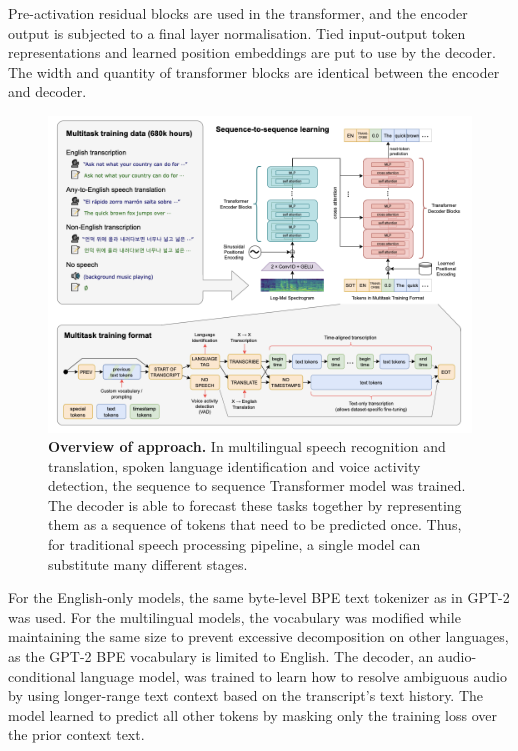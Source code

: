\documentclass[conference]{IEEEtran}
\begin{document}
Pre-activation residual blocks are used in the transformer, and the encoder output is subjected to a final layer normalisation. Tied input-output token representations and learned position embeddings are put to use by the decoder. The width and quantity of transformer blocks are identical between the encoder and decoder.

\begin{figure}[ht]
\centering
\includegraphics[width=\textwidth]{1.png}
\caption{\textbf{Overview of approach.} In multilingual speech recognition and translation, spoken language identification and voice activity detection, the sequence to sequence Transformer model was trained. The decoder is able to forecast these tasks together by representing them as a sequence of tokens that need to be predicted once.
Thus, for traditional speech processing pipeline, a single model can substitute many different stages.}
\label{fig:whisper_asr_architecture}
\end{figure}

For the English-only models, the same byte-level BPE text tokenizer as in GPT-2 was used. For the multilingual models, the vocabulary was modified while maintaining the same size to prevent excessive decomposition on other languages, as the GPT-2 BPE vocabulary is limited to English. The decoder, an audio-conditional language model, was trained to learn how to resolve ambiguous audio by using longer-range text context based on the transcript's text history. The model learned to predict all other tokens by masking only the training loss over the prior context text.
\end{document}
